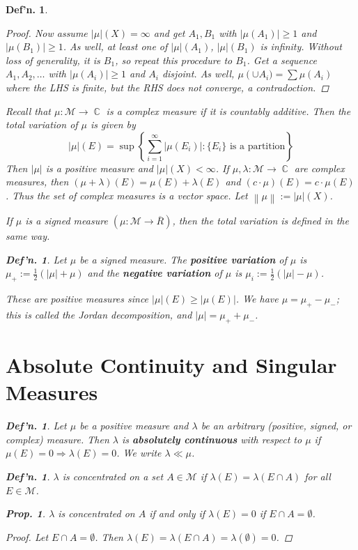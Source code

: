 \documentclass[12pt, a4paper]{book}
\DeclareMathOperator{\C}{\mathbb{C}}
\newcommand{\norm}[1]{\left\lVert#1\right\rVert} %
\newtheorem{definition}[theorem]{Def'n.}
\newtheorem{proposition}[theorem]{Prop.}
\theoremstyle{nonumberplain}
\newtheorem{proof}{Proof}
\begin{document}
\begin{definition}
\begin{proof}
    Now assume $|\mu|(X)=\infty$ and get $A_1,B_1$ with $|\mu(A_1)|\geq 1$ and $|\mu(B_1)|\geq 1$.
    As well, at least one of $|\mu|(A_1)$, $|\mu|(B_1)$ is infinity.
    Without loss of generality, it is $B_1$, so repeat this procedure to $B_1$.
    Get a sequence $A_1,A_2,\ldots$ with $|\mu(A_i)|\geq 1$ and $A_i$ disjoint.
    As well, $\mu\left(\cup A_i)=\sum \mu(A_i)$ where the LHS is finite, but the RHS does not converge, a contradoction.
\end{proof}
Recall that $\mu:\mathcal{M}\to\C$ is a complex measure if it is countably additive.
Then the total variation of $\mu$ is given by
\[|\mu|(E)=\sup\left\{\sum\limits_{i=1}^\infty|\mu(E_i)|:\{E_i\}\text{ is a partition}\right\}\]
Then $|\mu|$ is a positive measure and $|\mu|(X)<\infty$.
If $\mu,\lambda:\mathcal{M}\to\C$ are complex measures, then $(\mu+\lambda)(E)=\mu(E)+\lambda(E)$ and $(c\cdot\mu)(E)=c\cdot\mu(E)$.
Thus the set of complex measures is a vector space.
Let $\norm{\mu}:=|\mu|(X)$.

If $\mu$ is a signed measure $(\mu:\mathcal{M}\to\overline{R})$, then the total variation is defined in the same way.
\begin{definition}
    Let $\mu$ be a signed measure.
    The \textbf{positive variation} of $\mu$ is $\mu_+:=\frac{1}{2}(|\mu|+\mu)$ and the \textbf{negative variation} of $\mu$ is $\mu_i:=\frac{1}{2}(|\mu|-\mu)$.
\end{definition}
These are positive measures since $|\mu|(E)\geq|\mu(E)|$.
We have $\mu=\mu_+-\mu_-$; this is called the Jordan decomposition, and $|\mu|=\mu_++\mu_-$.
\section{Absolute Continuity and Singular Measures}
\begin{definition}
    Let $\mu$ be a positive measure and $\lambda$ be an arbitrary (positive, signed, or complex) measure.
    Then $\lambda$ is \textbf{absolutely continuous} with respect to $\mu$ if $\mu(E)=0\Rightarrow\lambda(E)=0$.
    We write $\lambda\ll\mu$.
\end{definition}
\begin{definition}
    $\lambda$ is concentrated on a set $A\in\mathcal{M}$ if $\lambda(E)=\lambda(E\cap A)$ for all $E\in\mathcal{M}$.
\end{definition}
\begin{proposition}
    $\lambda$ is concentrated on $A$ if and only if $\lambda(E)=0$ if $E\cap A=\emptyset$.
\end{proposition}
\begin{proof}
    Let $E\cap A=\emptyset$.
    Then $\lambda(E)=\lambda(E\cap A)=\lambda(\emptyset)=0$.


\end{proof}
\end{definition}
\end{document}
